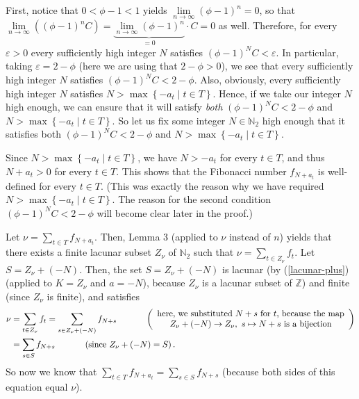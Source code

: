 \documentclass[12pt,final,notitlepage,onecolumn]{article}%
\begin{document}
First, notice that $0<\phi-1<1$ yields $\lim\limits_{n\rightarrow\infty
}\left(  \phi-1\right)  ^{n}=0$, so that $\lim\limits_{n\rightarrow\infty
}\left(  \left(  \phi-1\right)  ^{n}C\right)  =\underbrace{\lim
\limits_{n\rightarrow\infty}\left(  \phi-1\right)  ^{n}}_{=0}\cdot C=0$ as
well. Therefore, for every $\varepsilon>0$ every sufficiently high integer $N$
satisfies $\left(  \phi-1\right)  ^{N}C<\varepsilon$. In particular, taking
$\varepsilon=2-\phi$ (here we are using that $2-\phi>0$), we see that every
sufficiently high integer $N$ satisfies $\left(  \phi-1\right)  ^{N}C<2-\phi$.
Also, obviously, every sufficiently high integer $N$ satisfies $N>\max\left\{
-a_{t}\mid t\in T\right\}  $. Hence, if we take our integer $N$ high enough,
we can ensure that it will satisfy \textit{both} $\left(  \phi-1\right)
^{N}C<2-\phi$ and $N>\max\left\{  -a_{t}\mid t\in T\right\}  $. So let us fix
some integer $N\in\mathbb{N}_{2}$ high enough that it satisfies both $\left(
\phi-1\right)  ^{N}C<2-\phi$ and $N>\max\left\{  -a_{t}\mid t\in T\right\}  $.

Since $N>\max\left\{  -a_{t}\mid t\in T\right\}  $, we have $N>-a_{t}$ for
every $t\in T$, and thus $N+a_{t}>0$ for every $t\in T$. This shows that the
Fibonacci number $f_{N+a_{t}}$ is well-defined for every $t\in T$. (This was
exactly the reason why we have required $N>\max\left\{  -a_{t}\mid t\in
T\right\}  $. The reason for the second condition $\left(  \phi-1\right)
^{N}C<2-\phi$ will become clear later in the proof.)

Let $\nu=\sum\limits_{t\in T}f_{N+a_{t}}$. Then, Lemma 3 (applied to $\nu$
instead of $n$) yields that there exists a finite lacunar subset $Z_{\nu}$ of
$\mathbb{N}_{2}$ such that $\nu=\sum\limits_{t\in Z_{\nu}}f_{t}$. Let
$S=Z_{\nu}+\left(  -N\right)  $. Then, the set $S=Z_{\nu}+\left(  -N\right)  $
is lacunar (by (\ref{lacunar-plus}) (applied to $K=Z_{\nu}$ and $a=-N$), because
$Z_{\nu}$ is a lacunar subset of $\mathbb{Z}$) and finite (since $Z_{\nu}$ is
finite), and satisfies%
\begin{align*}
\nu &  =\sum\limits_{t\in Z_{\nu}}f_{t}=\sum\limits_{s\in Z_{\nu}+\left(
-N\right)  }f_{N+s}\ \ \ \ \ \ \ \ \ \ \left(
\begin{array}
[c]{c}%
\text{here, we substituted }N+s\text{ for }t\text{, because the map}\\
Z_{\nu}+\left(  -N\right)  \rightarrow Z_{\nu},\text{ }s\mapsto N+s\text{ is a
bijection}%
\end{array}
\right) \\
&  =\sum\limits_{s\in S}f_{N+s}\ \ \ \ \ \ \ \ \ \ \left(  \text{since }%
Z_{\nu}+\left(  -N\right)  =S\right)  .
\end{align*}
So now we know that $\sum\limits_{t\in T}f_{N+a_{t}}=\sum\limits_{s\in
S}f_{N+s}$ (because both sides of this equation equal $\nu$).
\end{document}
